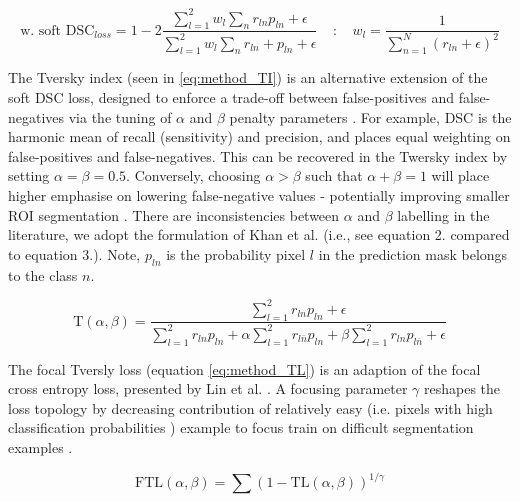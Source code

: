 \begin{equation}
\textrm{w. soft DSC$_{loss}$} = 1-2\frac{\sum_{l=1}^{2}w_{l}\sum_{n}r_{ln}p_{ln} + \epsilon}{\sum_{l=1}^{2}w_{l}\sum_{n}r_{ln} + p_{ln} + \epsilon} \; \;  \; \; \textbf{:} \; \; \; \; w_{l} = \frac{1}{\sum_{n=1}^{N}(r_{ln} + \epsilon)^2}
\label{eq:method_wsdsc}
\end{equation}
%


The Tversky index (seen in \ref{eq:method_TI}) is an alternative extension of the soft DSC loss, designed to enforce a trade-off between false-positives and false-negatives via the tuning of $\alpha$ and $\beta$ penalty parameters \cite{Khan2019}. For example, DSC is the harmonic mean of recall (sensitivity) and precision, and places equal weighting on false-positives and false-negatives. This can be recovered in the Twersky index by setting $\alpha = \beta = 0.5$. Conversely, choosing $\alpha > \beta$ such that $\alpha + \beta = 1$ will place higher emphasise on lowering false-negative values - potentially improving smaller ROI segmentation \cite{Khan2019}. There are inconsistencies between $\alpha$ and $\beta$ labelling in the literature, we adopt the formulation of Khan et al. \cite{Khan2019} (i.e., see \cite{Khan2019} equation 2. compared to \cite{salehi2017tversky} equation 3.). Note, $p_{ln}$ is the probability pixel $l$ in the prediction mask belongs to the class $n$.

\begin{equation}
\textrm{T}(\alpha, \beta) = \frac{\sum_{l=1}^{2}r_{ln}p_{ln} + \epsilon}{
\sum_{l=1}^{2}r_{ln}p_{ln} +
\alpha\sum_{l=1}^{2}r_{l\bar{n}}p_{ln} +
\beta\sum_{l=1}^{2}r_{ln}p_{l\bar{n}} + \epsilon	
}
\label{eq:method_TI}
\end{equation}

The focal Tversly loss (equation \ref{eq:method_TL}) is an adaption of the focal cross entropy loss, presented by Lin et al. \cite{lin2017focal}. A focusing parameter $\gamma$ reshapes the loss topology by decreasing contribution of relatively easy (i.e. pixels with high classification probabilities \cite{Khan2019}) example to focus train on difficult segmentation examples \cite{lin2017focal}.

\begin{equation}
\textrm{FTL}(\alpha, \beta) = \sum(1-\textrm{TL}(\alpha, \beta))^{1 / \gamma}
\label{eq:method_TL}
\end{equation}
